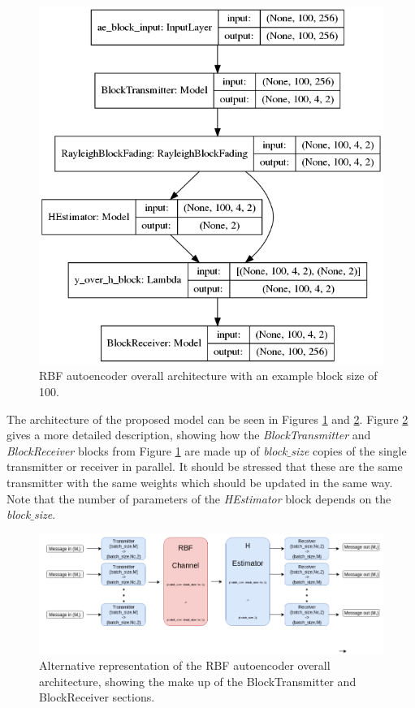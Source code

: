 \documentclass[12pt,onecolumn,letterpaper]{article}
\newcommand{\code}{\textit}
\newcommand\genfigsize{0.5}
\begin{document}
\begin{figure}
   \centering
   \includegraphics[width=\genfigsize\linewidth]{figures/aoudia_paper/autoencoder_rbf_10e2.png}
   \caption{RBF autoencoder overall architecture with an example block size of 100.}
   \label{fig:RbfOverallArchitecture}
\end{figure}

The architecture of the proposed model can be seen in Figures \ref{fig:RbfOverallArchitecture} and \ref{fig:RbfOverallArchitectureDrawIo}. Figure \ref{fig:RbfOverallArchitectureDrawIo} gives a more detailed description, showing how the \code{BlockTransmitter} and \code{BlockReceiver} blocks from Figure \ref{fig:RbfOverallArchitecture} are made up of \code{block$\_$size} copies of the single transmitter or receiver in parallel. It should be stressed that these are the same transmitter with the same weights which should be updated in the same way. Note that the number of parameters of the \code{HEstimator} block depends on the \code{block$\_$size}. 

\begin{figure}
   \centering
   \includegraphics[width=0.95\linewidth]{figures/aoudia_paper/autoencoder_rbf_block_architecture.png}
   \caption{Alternative representation of the RBF autoencoder overall architecture, showing the make up of the BlockTransmitter and BlockReceiver sections.}
   \label{fig:RbfOverallArchitectureDrawIo}
\end{figure}
\end{document}
